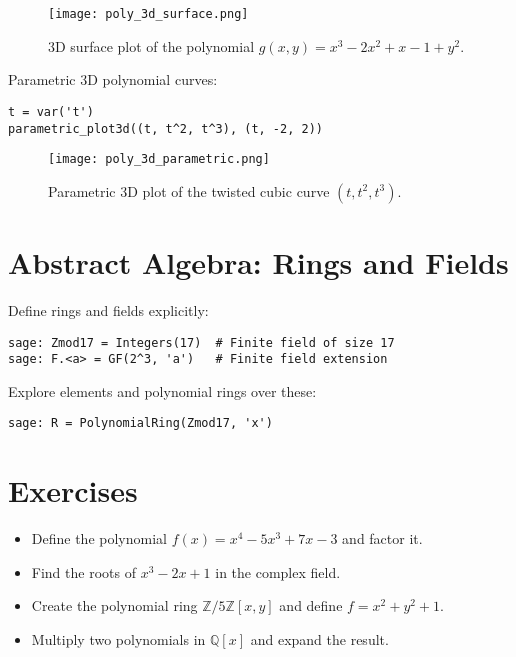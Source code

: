 \documentclass[12pt]{book}
\begin{document}
\begin{figure}[H]
  \centering
  \texttt{[image: poly\_3d\_surface.png]}
  \caption{3D surface plot of the polynomial \( g(x,y) = x^3 - 2x^2 + x - 1 + y^2 \).}
  \label{fig:poly_3d_surface}
\end{figure}

Parametric 3D polynomial curves:

\begin{verbatim}
t = var('t')
parametric_plot3d((t, t^2, t^3), (t, -2, 2))
\end{verbatim}

\begin{figure}[H]
  \centering
  \texttt{[image: poly\_3d\_parametric.png]}
  \caption{Parametric 3D plot of the twisted cubic curve \((t, t^2, t^3)\).}
  \label{fig:poly_3d_parametric}
\end{figure}

\section{Abstract Algebra: Rings and Fields}

Define rings and fields explicitly:

\begin{verbatim}
sage: Zmod17 = Integers(17)  # Finite field of size 17
sage: F.<a> = GF(2^3, 'a')   # Finite field extension
\end{verbatim}

Explore elements and polynomial rings over these:

\begin{verbatim}
sage: R = PolynomialRing(Zmod17, 'x')
\end{verbatim}

\section{Exercises}

\begin{itemize}
  \item Define the polynomial \( f(x) = x^4 - 5x^3 + 7x - 3 \) and factor it.
  \item Find the roots of \( x^3 - 2x + 1 \) in the complex field.
  \item Create the polynomial ring \( \mathbb{Z}/5\mathbb{Z}[x,y] \) and define \( f = x^2 + y^2 + 1 \).
  \item Multiply two polynomials in \( \mathbb{Q}[x] \) and expand the result.
\end{itemize}
\end{document}
